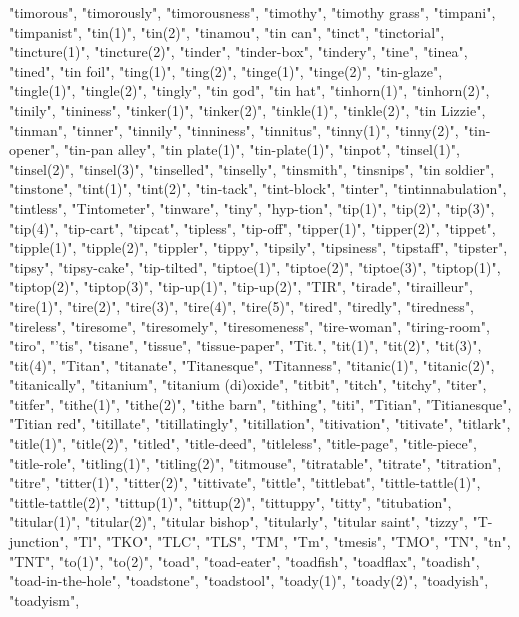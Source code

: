 "timorous",
"timorously",
"timorousness",
"timothy",
"timothy grass",
"timpani",
"timpanist",
"tin(1)",
"tin(2)",
"tinamou",
"tin can",
"tinct",
"tinctorial",
"tincture(1)",
"tincture(2)",
"tinder",
"tinder-box",
"tindery",
"tine",
"tinea",
"tined",
"tin foil",
"ting(1)",
"ting(2)",
"tinge(1)",
"tinge(2)",
"tin-glaze",
"tingle(1)",
"tingle(2)",
"tingly",
"tin god",
"tin hat",
"tinhorn(1)",
"tinhorn(2)",
"tinily",
"tininess",
"tinker(1)",
"tinker(2)",
"tinkle(1)",
"tinkle(2)",
"tin Lizzie",
"tinman",
"tinner",
"tinnily",
"tinniness",
"tinnitus",
"tinny(1)",
"tinny(2)",
"tin-opener",
"tin-pan alley",
"tin plate(1)",
"tin-plate(1)",
"tinpot",
"tinsel(1)",
"tinsel(2)",
"tinsel(3)",
"tinselled",
"tinselly",
"tinsmith",
"tinsnips",
"tin soldier",
"tinstone",
"tint(1)",
"tint(2)",
"tin-tack",
"tint-block",
"tinter",
"tintinnabulation",
"tintless",
"Tintometer",
"tinware",
"tiny",
"hyp-tion",
"tip(1)",
"tip(2)",
"tip(3)",
"tip(4)",
"tip-cart",
"tipcat",
"tipless",
"tip-off",
"tipper(1)",
"tipper(2)",
"tippet",
"tipple(1)",
"tipple(2)",
"tippler",
"tippy",
"tipsily",
"tipsiness",
"tipstaff",
"tipster",
"tipsy",
"tipsy-cake",
"tip-tilted",
"tiptoe(1)",
"tiptoe(2)",
"tiptoe(3)",
"tiptop(1)",
"tiptop(2)",
"tiptop(3)",
"tip-up(1)",
"tip-up(2)",
"TIR",
"tirade",
"tirailleur",
"tire(1)",
"tire(2)",
"tire(3)",
"tire(4)",
"tire(5)",
"tired",
"tiredly",
"tiredness",
"tireless",
"tiresome",
"tiresomely",
"tiresomeness",
"tire-woman",
"tiring-room",
"tiro",
"'tis",
"tisane",
"tissue",
"tissue-paper",
"Tit.",
"tit(1)",
"tit(2)",
"tit(3)",
"tit(4)",
"Titan",
"titanate",
"Titanesque",
"Titanness",
"titanic(1)",
"titanic(2)",
"titanically",
"titanium",
"titanium (di)oxide",
"titbit",
"titch",
"titchy",
"titer",
"titfer",
"tithe(1)",
"tithe(2)",
"tithe barn",
"tithing",
"titi",
"Titian",
"Titianesque",
"Titian red",
"titillate",
"titillatingly",
"titillation",
"titivation",
"titivate",
"titlark",
"title(1)",
"title(2)",
"titled",
"title-deed",
"titleless",
"title-page",
"title-piece",
"title-role",
"titling(1)",
"titling(2)",
"titmouse",
"titratable",
"titrate",
"titration",
"titre",
"titter(1)",
"titter(2)",
"tittivate",
"tittle",
"tittlebat",
"tittle-tattle(1)",
"tittle-tattle(2)",
"tittup(1)",
"tittup(2)",
"tittuppy",
"titty",
"titubation",
"titular(1)",
"titular(2)",
"titular bishop",
"titularly",
"titular saint",
"tizzy",
"T-junction",
"Tl",
"TKO",
"TLC",
"TLS",
"TM",
"Tm",
"tmesis",
"TMO",
"TN",
"tn",
"TNT",
"to(1)",
"to(2)",
"toad",
"toad-eater",
"toadfish",
"toadflax",
"toadish",
"toad-in-the-hole",
"toadstone",
"toadstool",
"toady(1)",
"toady(2)",
"toadyish",
"toadyism",
